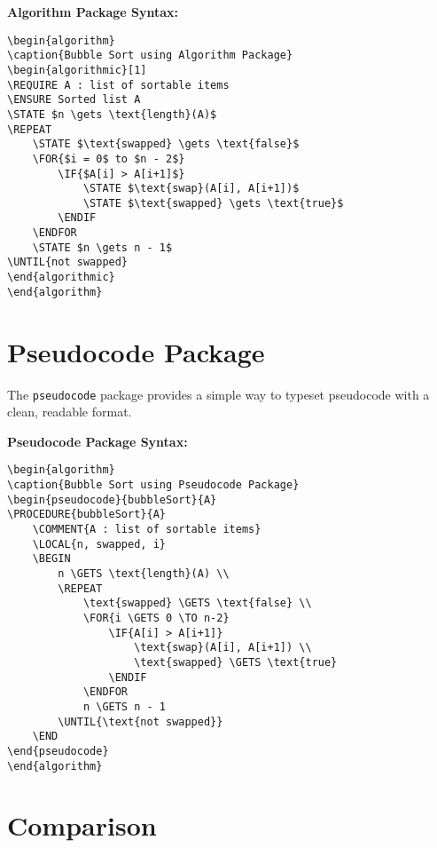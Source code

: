 \documentclass[12pt]{article}
\begin{document}
\textbf{Algorithm Package Syntax:}
\begin{verbatim}
\begin{algorithm}
\caption{Bubble Sort using Algorithm Package}
\begin{algorithmic}[1]
\REQUIRE A : list of sortable items
\ENSURE Sorted list A
\STATE $n \gets \text{length}(A)$
\REPEAT
    \STATE $\text{swapped} \gets \text{false}$
    \FOR{$i = 0$ to $n - 2$}
        \IF{$A[i] > A[i+1]$}
            \STATE $\text{swap}(A[i], A[i+1])$
            \STATE $\text{swapped} \gets \text{true}$
        \ENDIF
    \ENDFOR
    \STATE $n \gets n - 1$
\UNTIL{not swapped}
\end{algorithmic}
\end{algorithm}
\end{verbatim}

\section{Pseudocode Package}

The \texttt{pseudocode} package provides a simple way to typeset pseudocode with a clean, readable format.


\textbf{Pseudocode Package Syntax:}
\begin{verbatim}
\begin{algorithm}
\caption{Bubble Sort using Pseudocode Package}
\begin{pseudocode}{bubbleSort}{A}
\PROCEDURE{bubbleSort}{A}
    \COMMENT{A : list of sortable items}
    \LOCAL{n, swapped, i}
    \BEGIN
        n \GETS \text{length}(A) \\
        \REPEAT
            \text{swapped} \GETS \text{false} \\
            \FOR{i \GETS 0 \TO n-2}
                \IF{A[i] > A[i+1]}
                    \text{swap}(A[i], A[i+1]) \\
                    \text{swapped} \GETS \text{true}
                \ENDIF
            \ENDFOR
            n \GETS n - 1
        \UNTIL{\text{not swapped}}
    \END
\end{pseudocode}
\end{algorithm}
\end{verbatim}

\section{Comparison}
\end{document}
